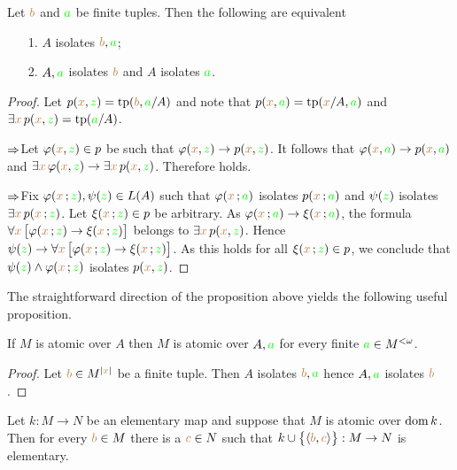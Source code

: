 \documentclass[creche.tex]{subfiles}
\begin{document}
\begin{proposition}
Let ${\color{brown} b}$ and ${\color{green} a}$ be finite tuples. Then the following are equivalent
\begin{itemize}
\item[1.] $A$ isolates  ${\color{brown} b},{\color{green} a}$;
\item[2.] $A,{\color{green} a}$ isolates ${\color{brown} b}$ and $A$ isolates ${\color{green} a}$.
\end{itemize}
\end{proposition}
\begin{proof}
Let $p({\color{brown} x},{\color{green} z})={\rm tp} ({\color{brown} b},{\color{green} a}/A)$ and note that  $p({\color{brown} x},{\color{green} a})={\rm tp}({\color{brown} x}/A,{\color{green} a})$ and $\exists{\color{brown}x}\,p({\color{brown} x},{\color{green} z})={\rm tp}({\color{green} a}/A)$. 

$\Rightarrow$\quad Let $\varphi({\color{brown} x},{\color{green} z})\in p$ be such that $\varphi({\color{brown} x},{\color{green} z})\rightarrow p({\color{brown} x},{\color{green} z})$. It follows that $\varphi({\color{brown} x},{\color{green} a})\rightarrow p({\color{brown} x},{\color{green} a})$ and $\exists{\color{brown}x}\, \varphi({\color{brown} x},{\color{green} z})\rightarrow \exists{\color{brown}x}\,p({\color{brown} x},{\color{green} z})$. Therefore  holds.

$\Rightarrow$\quad Fix $\varphi({\color{brown} x}\,;{\color{green} z}), \psi({\color{green} z})\in L(A)$ such that $\varphi({\color{brown} x}\,;{\color{green} a})$ isolates $p({\color{brown} x}\,;{\color{green} a})$ and $\psi({\color{green} z})$ isolates $\exists {\color{brown}x}\, p({\color{brown} x}\,;{\color{green} z})$. Let $\xi({\color{brown} x}\,;{\color{green} z})\in p$ be arbitrary. As $\varphi({\color{brown} x}\,;{\color{green} a})\rightarrow\xi({\color{brown} x}\,;{\color{green} a})$, the formula $\forall{\color{brown}x}\,\big[\varphi({\color{brown} x}\,;{\color{green} z})\rightarrow\xi({\color{brown} x}\,;{\color{green} z})\big]$ belongs to $\exists {\color{brown}x}\, p({\color{brown} x},{\color{green} z})$. Hence $\psi({\color{green} z})\rightarrow\forall{\color{brown}x}\,\big[\varphi({\color{brown} x}\,;{\color{green} z})\rightarrow\xi({\color{brown} x}\,;{\color{green} z})\big]$. As this holds for all $\xi({\color{brown} x}\,;{\color{green} z})\in p$, we conclude that $\psi({\color{green} z})\wedge\varphi({\color{brown} x}\,;{\color{green} z})$ isolates  $p({\color{brown} x},{\color{green} z})$.
\end{proof}

The straightforward direction of the proposition above yields the following useful proposition.

\begin{proposition}\label{prop_atomic_over_Aa}
If $M$ is atomic over $A$ then $M$ is atomic over $A,{\color{green} a}$ for every finite ${\color{green} a}\in M^{<\omega}$.
\end{proposition}
\begin{proof}
Let ${\color{brown} b}\in M^{|{\color{brown} x}|}$ be a finite tuple. Then $A$ isolates ${\color{brown} b},{\color{green} a}$  hence $A,{\color{green} a}$ isolates ${\color{brown} b}$.
\end{proof}

\begin{proposition}\label{prop_atomic_extension}
Let $k:M\to N$ be an elementary map and suppose that $M$ is atomic over $\mathop{\rm dom} k$. Then for every ${\color{brown} b}\in M$ there is a ${\color{brown} c}\in N$ such that $k\cup\big\{\langle{\color{brown}b},{\color{brown} c}\rangle\big\}:M\to N$ is elementary.
\end{proposition}
\end{document}
